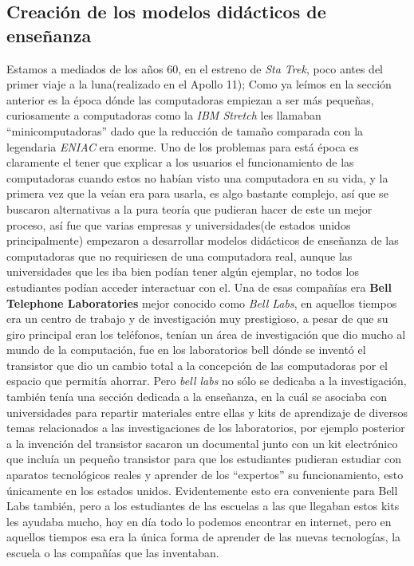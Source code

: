 \documentclass[letterpaper,12pt,oneside]{book}
\begin{document}
		\newpage		
		
		\subsection{Creación de los modelos didácticos de enseñanza}
		
		Estamos a mediados de los años 60, en el estreno de \textit{Sta Trek}, poco antes del primer viaje a la luna(realizado en el Apollo 11); Como ya leímos en la sección 
		anterior
		es la época dónde las computadoras empiezan a ser más pequeñas, curiosamente a computadoras como la \textit{IBM Stretch} les llamaban ``minicomputadoras'' dado
		que la reducción de tamaño comparada con la legendaria \textit{ENIAC} era enorme. Uno de los problemas para está época es claramente el tener que explicar
		a los usuarios el funcionamiento de las computadoras cuando estos no habían visto una computadora en su vida, y la primera vez que la veían era para usarla,
		es algo bastante complejo, así que se buscaron alternativas a la pura teoría que pudieran hacer de este un mejor proceso, así fue que varias empresas 
		y universidades(de estados unidos principalmente) empezaron a desarrollar modelos didácticos de enseñanza de las computadoras que no requiriesen de una computadora 
		real, aunque las universidades
		que les iba bien podían tener algún ejemplar, no todos los estudiantes podían acceder interactuar con el. Una de esas compañías era \textbf{Bell Telephone 
		Laboratories} mejor conocido como \textit{Bell Labs}, en aquellos tiempos era un centro de trabajo y de investigación muy prestigioso, a pesar de que su giro
		principal eran los teléfonos, tenían un área de investigación que dio mucho al mundo de la computación, fue en los laboratorios bell dónde se inventó el transistor
		que dio un cambio total a la concepción de las computadoras por el espacio que permitía ahorrar. Pero \textit{bell labs} no sólo se dedicaba a la investigación,
		también tenía una sección dedicada a la enseñanza, en la cuál se asociaba con universidades para repartir materiales entre ellas y kits de aprendizaje de diversos
		temas relacionados a las investigaciones de los laboratorios, por ejemplo posterior a la invención del transistor sacaron un documental junto
		con un kit electrónico que incluía un pequeño transistor para que los estudiantes pudieran estudiar con aparatos tecnológicos reales y aprender
		de los ``expertos'' su funcionamiento, esto únicamente en los estados unidos. Evidentemente esto era conveniente para Bell Labs también, pero a los estudiantes de las 
		escuelas a las
		que llegaban estos kits les ayudaba mucho, hoy en día todo lo podemos encontrar en internet, pero en aquellos tiempos esa era la única forma de aprender
		de las nuevas tecnologías, la escuela o las compañías que las inventaban.
		
\end{document}
